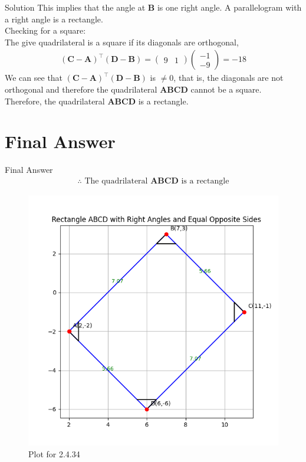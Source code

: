 \documentclass{beamer}
\let\vec\mathbf
\providecommand{\brak}[1]{\ensuremath{\left(#1\right)}}
\theoremstyle{remark}
\newcommand{\myvec}[1]{\ensuremath{\begin{pmatrix}#1\end{pmatrix}}}
\begin{document}
\begin{frame}{Solution}
This implies that the angle at $\vec{B}$ is one right angle. A parallelogram with a right angle is a rectangle.\\
Checking for a square:\\
The give quadrilateral is a square if its diagonals are orthogonal,
\begin{align}
    \brak{\vec{C}- \vec{A}}^{\top} \brak{\vec{D}- \vec{B}}=\myvec{9 & 1}\myvec{-1 \\ -9}=-18
\end{align}
We can see that $\brak{\vec{C}- \vec{A}}^{\top} \brak{\vec{D}- \vec{B}}$ is $\neq 0$, that is, the diagonals are not orthogonal and therefore the quadrilateral $\vec{A}\vec{B}\vec{C}\vec{D}$ cannot be a square.\\
Therefore, the quadrilateral $\vec{A}\vec{B}\vec{C}\vec{D}$ is a rectangle.
    
\end{frame}


\section{Final Answer}
\begin{frame}{Final Answer}
\begin{align}
    \text{$\therefore$ The quadrilateral $\vec{A}\vec{B}\vec{C}\vec{D}$ is a rectangle}
\end{align}
\begin{figure}
    \centering
    \includegraphics[width=0.6\columnwidth]{figs/1.png} 
    \caption{Plot for 2.4.34}
    \label{fig:placeholder}
\end{figure}
\end{frame}
\end{document}

